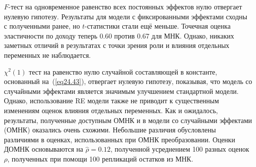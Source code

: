 $F$-тест на одновременное равенство всех постоянных эффектов нулю отвергает нулевую гипотезу. Результаты для модели с фиксированными эффектами сходны с полученными ранее, но $t$-статистики стали ещё меньше. Точечная оценка эластичности по доходу теперь 0.60 против 0.67 для МНК. Однако, никаких заметных отличий в результатах с точки зрения роли и влияния отдельных переменных не наблюдается. 

$\chi^2(1)$ тест на равенство нулю случайной составляющей в константе, основанный на~(\ref{eq24.43}), отвергает нулевую гипотезу, показывая, что модель со случайными эффектами является значимым улучшением стандартной модели. Однако, использование RE модели также не приводит к существенным изменениям оценок влияния отдельных переменных. Как и ожидалось, результаты, полученные доступным ОМНК и в модели со случайными эффектами (ОМНК) оказались очень схожими. Небольшие различия обусловлены различиями в оценках, использованных при ОМНК преобразовании. Оценки ДОМНК основываются на $\hat \rho = 0.12$, полученной усреднением 100 разных оценок $\rho$, полученных при помощи 100 репликаций остатков из МНК. 

